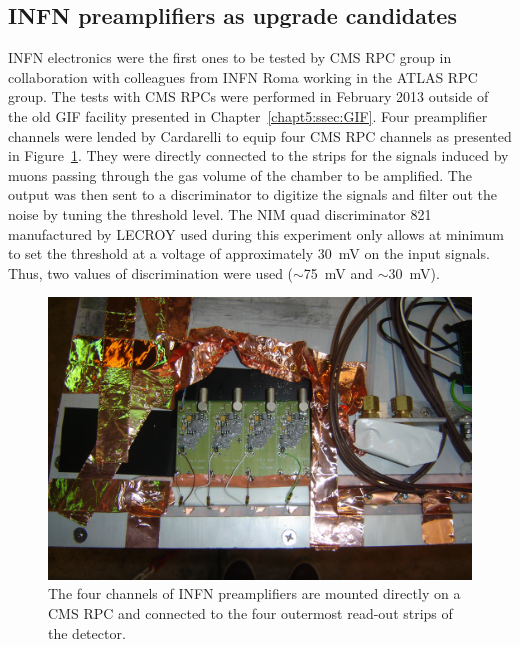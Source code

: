 	\subsection{INFN preamplifiers as upgrade candidates}
	\label{chapt6:ssec:INFN-Prelim}
	
	INFN electronics were the first ones to be tested by CMS RPC group in collaboration with colleagues from INFN Roma working in the ATLAS RPC group. The tests with CMS RPCs were performed in February 2013 outside of the old GIF facility presented in Chapter~\ref{chapt5:ssec:GIF}. Four preamplifier channels were lended by Cardarelli to equip four CMS RPC channels as presented in Figure~\ref{fig:INFN-preamp}. They were directly connected to the strips for the signals induced by muons passing through the gas volume of the chamber to be amplified. The output was then sent to a discriminator to digitize the signals and filter out the noise by tuning the threshold level. The NIM quad discriminator 821 manufactured by LECROY used during this experiment only allows at minimum to set the threshold at a voltage of approximately \SI{30}{mV} on the input signals. Thus, two values of discrimination were used ($\sim$\SI{75}{mV} and $\sim$\SI{30}{mV}).
	
	\begin{figure}[H]
		\centering
		\includegraphics[width=0.8\plotwidth]{fig/chapt6/INFN-Preamp-2013.JPG}
		\caption{\label{fig:INFN-preamp} The four channels of INFN preamplifiers are mounted directly on a CMS RPC and connected to the four outermost read-out strips of the detector.}
	\end{figure}
	
